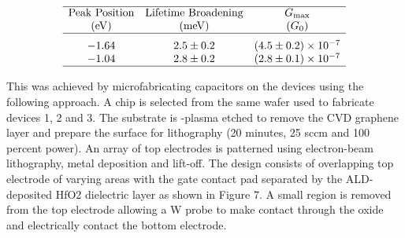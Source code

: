 \begin{table}
    \caption{\label{tab:gnr-hybrid_peaks_fitting}
        Lorentzian fit parameters extracted by fitting a low-bias gate trace. The two peaks are separated by 600 meV in voltage, which could be assigned to the single-electron charge transition $N \leftrightarrow N+1$, where $N$ is the number of electrons on the ribbons which is unknown. Reported errors are fitting errors.}
    \[
        \begin{array}{ccc}
            \hline\textrm{Peak Position}  & \textrm{Lifetime Broadening} & G_\textrm{max}                   \\
            \textrm{(\si{\electronvolt})} & (\si{\milli\electronvolt})   & (G_0)                            \\
            \hline
            -1.64                         & 2.5\pm0.2                    & (4.5\pm0.2)\times10^{-7} \Tsmall \\
            -1.04                         & 2.8\pm0.2                    & (2.8\pm0.1)\times10^{-7}         \\
            \hline
        \end{array}
    \]
\end{table}

This was achieved by microfabricating capacitors on the devices using the following approach. A chip is selected from the same wafer used to fabricate devices 1, 2 and 3. The substrate is -plasma etched to remove the \gls{CVD} graphene layer and prepare the surface for lithography (20 minutes, 25 sccm and 100 percent power). An array of top electrodes is patterned using electron-beam lithography, metal deposition and lift-off. The design consists of overlapping top electrode of varying areas with the gate contact pad separated by the ALD-deposited HfO2 dielectric layer as shown in Figure 7. A small region is removed from the top electrode allowing a W probe to make contact through the oxide and electrically contact the bottom electrode.

